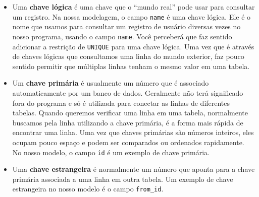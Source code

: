\begin{itemize}


\item Uma {\bf chave lógica} é uma chave que o ``mundo real'' pode usar para
  consultar um registro. Na nossa modelagem, o campo {\tt name} é uma chave lógica.
  Ele é o nome que usamos para consultar um registro de
  usuário diversas vezes no nosso programa, usando o campo {\tt name}. Você
  perceberá que faz sentido adicionar a restrição de {\tt UNIQUE} para uma
  chave lógica. Uma vez que é através de chaves lógicas que consultamos uma
  linha do mundo exterior, faz pouco sentido permitir que múltiplas
  linhas tenham o mesmo valor em uma tabela.
  

\item Um {\bf chave primária} é usualmente um número que é associado
  automaticamente por um banco de dados. Geralmente não terá significado fora
  do programa e só é utilizada para conectar as linhas de diferentes tabelas.
  Quando queremos verificar uma linha em uma tabela, normalmente buscamos pela
  linha utilizando a chave primária, é a forma mais rápida de encontrar uma
  linha. Uma vez que chaves primárias são números inteiros, eles ocupam pouco
  espaço e podem ser comparados ou ordenados rapidamente. No nosso modelo, o
  campo {\tt id} é um exemplo de chave primária.
  

\item Uma {\bf chave estrangeira} é normalmente um número que aponta para a
  chave primária associada a uma linha em outra tabela. Um exemplo de chave
  estrangeira no nosso modelo é o campo \verb"from_id".
\end{itemize}

